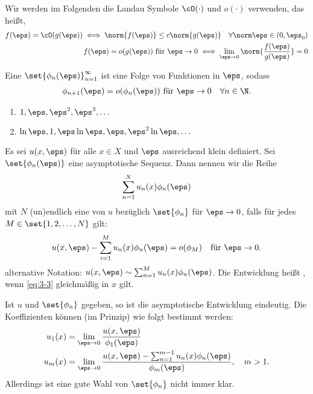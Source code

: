 Wir werden im Folgenden die Landau Symbole $\cO(\cdot)$ und $o(\cdot)$ verwenden, das heißt,
\begin{align*}
  f(\eps) = \cO(g(\eps)) \iff \norm{f(\eps)}\leq c \norm{g(\eps)} \quad \forall \norm \eps \in (0, \eps_{0})\\
  f(\eps) = o(g(\eps)) \text{ für }\eps \to 0 \iff \lim_{\eps \to 0} \norm{\frac {f(\eps)}{g(\eps)}} = 0
\end{align*}
\begin{definition}\label{def:3-2}
  Eine  $\set{\phi_{n}(\eps)}_{n = 1}^{\infty}$ ist eine Folge von Funktionen in $\eps$, sodass
  \begin{align*}
    \phi_{n+1} (\eps) = o(\phi_{n}(\eps)) \text{ für }\eps \to 0 \quad \forall n \in \N. 
  \end{align*}
\end{definition}
\begin{beispiel*}
  \begin{enumerate}
  \item $1, \eps, \eps^{2}, \eps^{3}, \dots$
  \item $\ln \eps, 1,\eps \ln \eps, \eps, \eps^{2}\ln \eps, \dots$
  \end{enumerate}
\end{beispiel*}
\begin{definition}\label{def:3-3}
  Es sei $u(x, \eps)$ für alle $x \in X$ und $\eps$ ausreichend klein definiert. Sei $\set{\phi_{n}(\eps)}$ eine asymptotische Sequenz. Dann nennen wir die Reihe
  \begin{align*}
    \sum_{n = 1}^{N} u_{n}(x)\phi_{n}(\eps)
  \end{align*}
mit $N$ (un)endlich eine  von $u$ bezüglich $\set{\phi_{n}}$ für $\eps \to 0$, falls für jedes $M \in \set{1, 2, \dots, N}$ gilt:
\begin{align}\label{eq:3-3}
  u(x, \eps) - \sum_{i = 1}^{M} u_{n}(x)\phi_{n}(\eps) = o(\phi_{M}) \quad \text{für } \eps \to 0. 
\end{align}
alternative Notation: $u(x, \eps) \sim \sum_{n =1}^{M}u_{n}(x)\phi_{n}(\eps)$. Die Entwicklung heißt , wenn \eqref{eq:3-3} gleichmäßig in $x$ gilt. 

Ist $u$ und $\set{\phi_{n}}$ gegeben, so ist die asymptotische Entwicklung eindeutig. Die Koeffizienten können (im Prinzip) wie folgt bestimmt werden:
\begin{align*}
  u_{1}(x) &= \lim_{\eps \to 0} \frac{u(x, \eps)}{\phi_{1}(\eps)}\\
  u_{m}(x) &= \lim_{\eps \to 0} \frac{u(x, \eps) - \sum_{n = 1}^{m-1} u_{n}(x) \phi_{n}(\eps)}{\phi_{m}(\eps)}, \quad m > 1.
\end{align*}
Allerdings ist eine gute Wahl von $\set{\phi_{n}}$ nicht immer klar. 
\end{definition}
